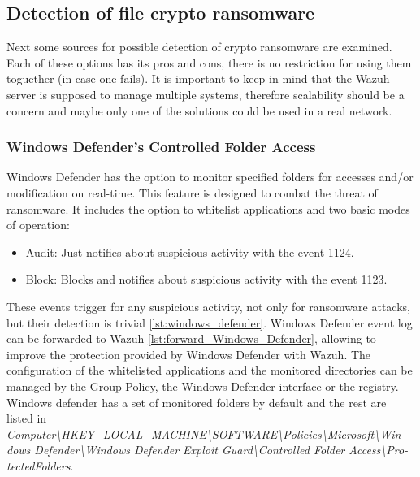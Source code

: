 \subsection{Detection of file crypto ransomware}
Next some sources for possible detection of crypto ransomware are examined.
Each of these options has its pros and cons, there is no restriction for using them toguether (in case one fails).
It is important to keep in mind that the Wazuh server is supposed to manage multiple systems, therefore scalability should be a concern and maybe only one of the solutions could be used in a real network.

\subsubsection{Windows Defender's Controlled Folder Access}
Windows Defender has the option to monitor specified folders for accesses and/or modification on real-time.
This feature is designed to combat the threat of ransomware.
It includes the option to whitelist applications and two basic modes of operation\cite{hardening_windows_10}:
\begin{itemize}
	\item Audit: Just notifies about suspicious activity with the event 1124.
	\item Block: Blocks and notifies about suspicious activity with the event 1123.
\end{itemize}
\linej
These events trigger for any suspicious activity, not only for ransomware attacks, but their detection is trivial \ref{lst:windows_defender}.
Windows Defender event log can be forwarded to Wazuh \ref{lst:forward_Windows_Defender}, allowing to improve the protection provided by Windows Defender with Wazuh.
The configuration of the whitelisted applications and the monitored directories can be managed by the Group Policy, the Windows Defender interface or the registry.
\linej
Windows defender has a set of monitored folders by default and the rest are listed in \textit{Computer{\textbackslash}HKEY\_LOCAL\_MACHINE{\textbackslash}SOFTWARE{\textbackslash}Policies{\textbackslash}Microsoft{\textbackslash}Win- dows Defender{\textbackslash}Windows Defender Exploit Guard{\textbackslash}Controlled Folder Access{\textbackslash}Pro- tectedFolders}.

